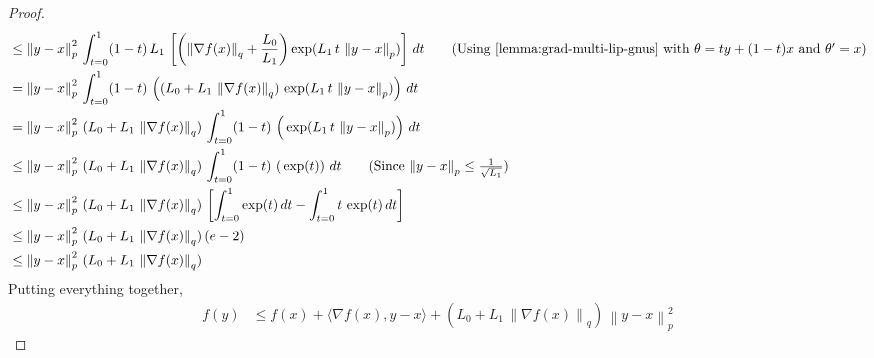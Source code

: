\documentclass{article}
\newcommand{\normsq}[1]{\left\|#1 \right\|^{2}}
\newcommand{\norm}[1]{\left\|#1 \right\|}
\begin{document}
\begin{proof}
\begin{align*}
& \leq \normsq{y - x}_p \,  \int_{t = 0}^{1} (1-t) \, L_1 \, \left[ \left(\norm{\nabla f(x)}_q + \frac{L_0}{L_1} \right) \exp(L_1 \, t \, \norm{y - x}_p) \right] \, dt \tag{Using~\cref{lemma:grad-multi-lip-gnus} with $\theta = ty + (1-t)x$ and $\theta' = x$} \\
& = \normsq{y - x}_p \,  \int_{t = 0}^{1} (1-t) \, \left((L_0 + L_1 \, \norm{\nabla f(x)}_q) \, \exp(L_1 \, t \, \norm{y - x}_p)  \right)\, dt \\
& = \normsq{y - x}_p \, (L_0 + L_1 \, \norm{\nabla f(x)}_q)\, \int_{t = 0}^{1} (1-t) \, \left( \, \exp(L_1 \, t \, \norm{y - x}_p)  \right)\, dt \\
& \leq  \normsq{y - x}_p \, (L_0 + L_1 \, \norm{\nabla f(x)}_q)\, \int_{t = 0}^{1} (1-t) \, \left( \, \exp(  t   )  \right)\, dt \tag{Since $\norm{y - x}_p \leq \frac{1}{\sqrt{L_1}}$} \\
& \leq \normsq{y - x}_p \, (L_0 + L_1 \, \norm{\nabla f(x)}_q)\, \left[\int_{t = 0}^{1} \exp(t) \, dt - \int_{t = 0}^{1} t \, \exp(t) \, dt \right]  \\
& \leq \normsq{y - x}_p \, (L_0 + L_1 \, \norm{\nabla f(x)}_q)\, (e-2)  \\
& \leq \normsq{y - x}_p \, (L_0 + L_1 \, \norm{\nabla f(x)}_q)\\
\end{align*}
Putting everything together, 
\begin{align*}
f(y) &\leq f(x) + \langle \nabla f(x), y - x \rangle + \left(L_0 + L_1 \, \norm{\nabla f(x)}_q \right) \, \normsq{y - x}_p
\end{align*}
\end{proof}
\end{document}
